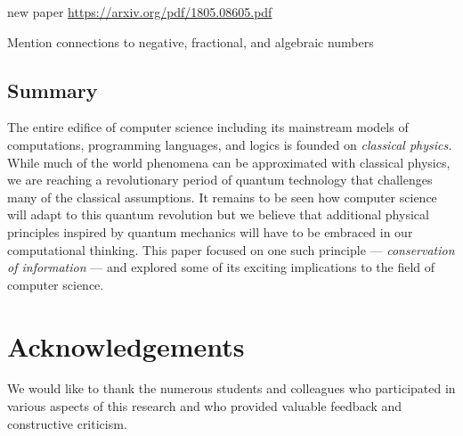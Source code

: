 \documentclass{article}
\begin{document}
new paper \url{https://arxiv.org/pdf/1805.08605.pdf}

Mention connections to negative, fractional, and algebraic numbers

\subsection{Summary} 

The entire edifice of computer science including its mainstream models
of computations, programming languages, and logics is founded on
\emph{classical physics.} While much of the world phenomena can be
approximated with classical physics, we are reaching a revolutionary
period of quantum technology that challenges many of the classical
assumptions. It remains to be seen how computer science will adapt to
this quantum revolution but we believe that additional physical
principles inspired by quantum mechanics will have to be embraced in
our computational thinking. This paper focused on one such principle
--- \emph{conservation of information} --- and explored some of its
exciting implications to the field of computer science. 

\section*{Acknowledgements} We would like to thank the numerous
students and colleagues who participated in various aspects of this
research and who provided valuable feedback and constructive criticism.



\end{document}

